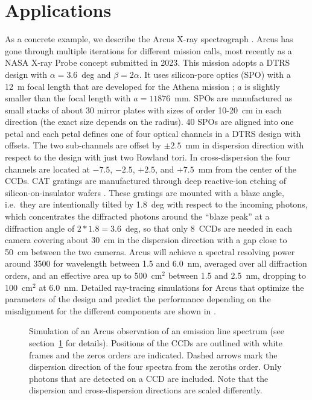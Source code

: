 \documentclass[linenumbers]{aastex631}
\begin{document}
\section{Applications}
\label{sect:applications}
As a concrete example, we describe the Arcus X-ray spectrograph  \citep{2023SPIE12678E..0ES}. Arcus has gone through multiple iterations for different mission calls, most recently as a NASA X-ray Probe concept submitted in 2023. This mission adopts a DTRS design with $\alpha=3.6$~deg and $\beta=2\alpha$. It uses silicon-pore optics (SPO) with a 12~m focal length that are developed for the Athena mission \citep{2023SPIE12679E..05G}; $a$ is slightly smaller than the focal length with $a=11876$~mm. SPOs are manufactured as small stacks of about 30 mirror plates with sizes of order 10-20~cm in each direction (the exact size depends on the radius). 40 SPOs are aligned into one petal and each petal defines one of four optical channels in a DTRS design with offsets. The two sub-channels are offset by $\pm2.5$~mm in dispersion direction with respect to the design with just two Rowland tori. In cross-dispersion the four channels are located at $-7.5$, $-2.5$, $+2.5$, and $+7.5$~mm from the center of the CCDs.
CAT gratings are manufactured through deep reactive-ion etching of silicon-on-insulator wafers \citep{2022ApJ...934..171H,2023SPIE12679E..0LH}. These gratings are mounted with a blaze angle, i.e.\ they are intentionally tilted by 1.8~deg with respect to the incoming photons, which concentrates the diffracted photons around the ``blaze peak'' at a diffraction angle of $2 * 1.8 = 3.6$~deg, so that only 8~CCDs are needed in each camera covering about 30~cm in the dispersion direction with a gap close to 50~cm between the two cameras. Arcus will achieve a spectral resolving power around 3500 for wavelength between 1.5 and 6.0~nm, averaged over all diffraction orders, and an effective area up to 500~cm$^2$ between 1.5 and 2.5~nm, dropping to 100~cm$^2$ at 6.0~nm. Detailed ray-tracing simulations for Arcus that optimize the parameters of the design and predict the performance depending on the misalignment for the different components are shown in \citet{2017SPIE10397E..0PG,2018SPIE10699E..6FG,2023SPIE12678E..1DG}.


\begin{figure}
    \caption{Simulation of an Arcus observation of an emission line spectrum (see section~\ref{sect:applications} for details). Positions of the CCDs are outlined with white frames and the zeros orders are indicated. Dashed arrows mark the dispersion direction of the four spectra from the zeroths order. Only photons that are detected on a CCD are included. Note that the dispersion and cross-dispersion directions are scaled differently.
        }
    \label{fig:Arcusfull}
\end{figure}
\end{document}
